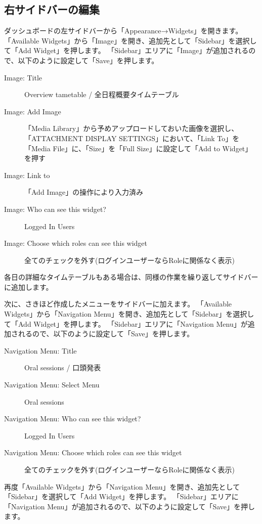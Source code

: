 \documentclass[titlepage,10pt,a4paper,uplatex]{jsbook}
\begin{document}
\subsection{右サイドバーの編集}

ダッシュボードの左サイドバーから「Appearance→Widgets」を開きます。
「Available Widgets」から「Image」を開き、追加先として「Sidebar」を選択して「Add Widget」を押します。
「Sidebar」エリアに「Image」が追加されるので、以下のように設定して「Save」を押します。

\begin{description}
\item[Image: Title] Overview tametable / 全日程概要タイムテーブル
\item[Image: Add Image] 「Media Library」から予めアップロードしておいた画像を選択し、「ATTACHMENT DISPLAY SETTINGS」において、「Link To」を「Media File」に、「Size」を「Full Size」に設定して「Add to Widget」を押す
\item[Image: Link to] 「Add Image」の操作により入力済み
\item[Image: Who can see this widget?] Logged In Users
\item[Image: Choose which roles can see this widget] 全てのチェックを外す(ログインユーザーならRoleに関係なく表示)
\end{description}

各日の詳細なタイムテーブルもある場合は、同様の作業を繰り返してサイドバーに追加します。

次に、さきほど作成したメニューをサイドバーに加えます。
「Available Widgets」から「Navigation Menu」を開き、追加先として「Sidebar」を選択して「Add Widget」を押します。
「Sidebar」エリアに「Navigation Menu」が追加されるので、以下のように設定して「Save」を押します。

\begin{description}
\item[Navigation Menu: Title] Oral sessions / 口頭発表
\item[Navigation Menu: Select Menu] Oral sessions
\item[Navigation Menu: Who can see this widget?] Logged In Users
\item[Navigation Menu: Choose which roles can see this widget] 全てのチェックを外す(ログインユーザーならRoleに関係なく表示)
\end{description}

再度「Available Widgets」から「Navigation Menu」を開き、追加先として「Sidebar」を選択して「Add Widget」を押します。
「Sidebar」エリアに「Navigation Menu」が追加されるので、以下のように設定して「Save」を押します。
\end{document}
